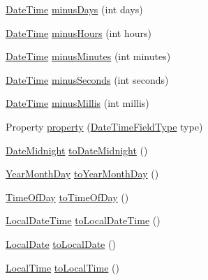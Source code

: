 \begin{DoxyCompactItemize}
\hyperlink{classorg_1_1joda_1_1time_1_1_date_time}{Date\-Time} \hyperlink{classorg_1_1joda_1_1time_1_1_date_time_a254102519294f7048dd0eb03a1a9908c}{minus\-Days} (int days)
\item 
\hyperlink{classorg_1_1joda_1_1time_1_1_date_time}{Date\-Time} \hyperlink{classorg_1_1joda_1_1time_1_1_date_time_a4436949d2442cd09c8ccc6ec4e6c8457}{minus\-Hours} (int hours)
\item 
\hyperlink{classorg_1_1joda_1_1time_1_1_date_time}{Date\-Time} \hyperlink{classorg_1_1joda_1_1time_1_1_date_time_a24ec72884d325fb1ea746eddbd6262bf}{minus\-Minutes} (int minutes)
\item 
\hyperlink{classorg_1_1joda_1_1time_1_1_date_time}{Date\-Time} \hyperlink{classorg_1_1joda_1_1time_1_1_date_time_a3ec46ccf90410a1ed7cf9508278baa8d}{minus\-Seconds} (int seconds)
\item 
\hyperlink{classorg_1_1joda_1_1time_1_1_date_time}{Date\-Time} \hyperlink{classorg_1_1joda_1_1time_1_1_date_time_a6cc82fd6462d0f1c9c91536ec6e2d5cc}{minus\-Millis} (int millis)
\item 
Property \hyperlink{classorg_1_1joda_1_1time_1_1_date_time_aec44c0aeabdeb951c626bb19ec4b40aa}{property} (\hyperlink{classorg_1_1joda_1_1time_1_1_date_time_field_type}{Date\-Time\-Field\-Type} type)
\item 
\hyperlink{classorg_1_1joda_1_1time_1_1_date_midnight}{Date\-Midnight} \hyperlink{classorg_1_1joda_1_1time_1_1_date_time_aa86546fdfc0384adc4ee0fd02fb0d235}{to\-Date\-Midnight} ()
\item 
\hyperlink{classorg_1_1joda_1_1time_1_1_year_month_day}{Year\-Month\-Day} \hyperlink{classorg_1_1joda_1_1time_1_1_date_time_a6248810e7ed19e93cb660a37d9f01890}{to\-Year\-Month\-Day} ()
\item 
\hyperlink{classorg_1_1joda_1_1time_1_1_time_of_day}{Time\-Of\-Day} \hyperlink{classorg_1_1joda_1_1time_1_1_date_time_abbf9279cb907ae0ca385583c3d98afee}{to\-Time\-Of\-Day} ()
\item 
\hyperlink{classorg_1_1joda_1_1time_1_1_local_date_time}{Local\-Date\-Time} \hyperlink{classorg_1_1joda_1_1time_1_1_date_time_a6863f891d122ad930c5370ed851fc6b9}{to\-Local\-Date\-Time} ()
\item 
\hyperlink{classorg_1_1joda_1_1time_1_1_local_date}{Local\-Date} \hyperlink{classorg_1_1joda_1_1time_1_1_date_time_a4dd73d108ad3e5988cf82347a1b43756}{to\-Local\-Date} ()
\item 
\hyperlink{classorg_1_1joda_1_1time_1_1_local_time}{Local\-Time} \hyperlink{classorg_1_1joda_1_1time_1_1_date_time_a68ccb3437455ab860f1ad281331184fc}{to\-Local\-Time} ()

\end{DoxyCompactItemize}
